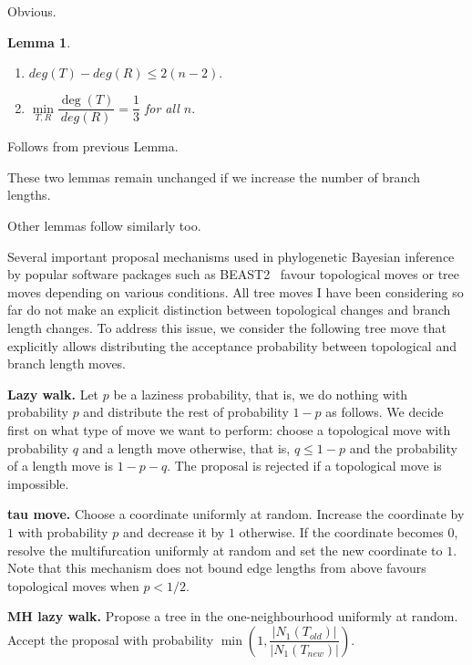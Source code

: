 \documentclass{amsart}
\newtheorem{lemma}{Lemma}
\begin{document}
\proof
Obvious.
\endproof

\begin{lemma}
\begin{enumerate}[(1)]
\item $deg(T)-deg(R) \leq 2(n-2).$
\item $\min\limits_{T,R}\dfrac{\deg(T)}{deg(R)} = \dfrac13$ for all $n.$
\end{enumerate}
\end{lemma}

\proof
Follows from previous Lemma. 
\endproof

These two lemmas remain unchanged if we increase the number of branch lengths. 

Other lemmas follow similarly too. 

Several important proposal mechanisms used in phylogenetic Bayesian inference by 
popular software packages such as BEAST2~\cite{beast2} favour topological moves
or tree moves depending on various conditions. All tree moves I have been 
considering so far do not make an explicit distinction between topological 
changes and branch length changes. To address this issue, we consider the
following tree move that explicitly allows distributing the acceptance 
probability between topological and branch length moves. 

{\bf Lazy walk.} Let $p$ be a laziness probability, that is, we do nothing 
with probability $p$ and distribute the rest of probability $1-p$ as follows. 
We decide first on what type of move we want to perform: choose a topological 
move with probability $q$ and a length move otherwise, that is, $q \leq 1-p$
and the probability of a length move is $1-p-q$. The proposal is rejected if
a topological move is impossible. 

{\bf tau move.} Choose a coordinate uniformly at random. Increase the
coordinate by $1$ with probability $p$ and decrease it by $1$ otherwise.
If the coordinate becomes $0$, resolve the multifurcation uniformly at
random and set the new coordinate to $1$. Note that this mechanism 
does not bound edge lengths from above favours topological moves when 
$p<1/2$. 

{\bf MH lazy walk.} Propose a tree in the one-neighbourhood uniformly at random. 
Accept the proposal with probability 
$\min(1, \dfrac{|N_1(T_{old})|}{|N_1(T_{new})|})$. 
\end{document}
